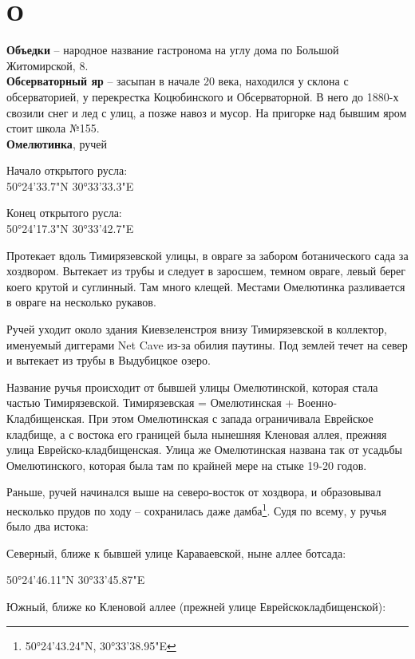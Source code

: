\chapter*{О}

\textbf{Объедки} – народное название гастронома на углу дома по Большой Житомирской, 8.\\

\textbf{Обсерваторный яр} – засыпан в начале 20 века, находился у склона с обсерваторией, у перекрестка Коцюбинского и Обсерваторной. В него до 1880-х свозили снег и лед с улиц, а позже навоз и мусор. На пригорке над бывшим яром стоит школа №155.\\

\textbf{Омелютинка}, ручей

Начало открытого русла:\\ 50°24'33.7"N 30°33'33.3"E

Конец открытого русла:\\ 50°24'17.3"N 30°33'42.7"E

Протекает вдоль Тимирязевской улицы, в овраге за забором ботанического сада за хоздвором. Вытекает из трубы и следует в заросшем, темном овраге, левый берег коего крутой и суглинный. Там много клещей. Местами Омелютинка разливается в овраге на несколько рукавов.

Ручей уходит около здания Киевзеленстроя внизу Тимирязевской в коллектор, именуемый диггерами Net Cave из-за обилия паутины. Под землей течет на север и вытекает из трубы в Выдубицкое озеро.

Название ручья происходит от бывшей улицы Омелютинской, которая стала частью Тимирязевской. Тимирязевская = Омелютинская + Военно-Кладбищенская. При этом Омелютинская с запада ограничивала Еврейское кладбище, а с востока его границей была нынешняя Кленовая аллея, прежняя улица Еврейско-кладбищенская. Улица же Омелютинская названа так от усадьбы Омелютинского, которая была там по крайней мере на стыке 19-20 годов.

Раньше, ручей начинался выше на северо-восток от хоздвора, и образовывал несколько прудов по ходу – сохранилась даже дамба\footnote{50°24'43.24"N,  30°33'38.95"E}. Судя по всему, у ручья было два истока:

Северный, ближе к бывшей улице Караваевской, ныне аллее ботсада: 

50°24'46.11"N 30°33'45.87"E

Южный, ближе ко Кленовой аллее (прежней улице Еврейскокладбищенской):

